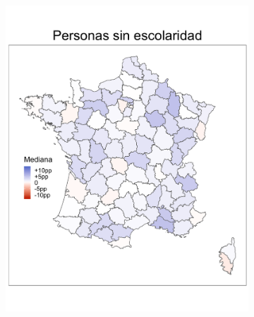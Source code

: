 \begin{figure}
\begin{subfigure}{0.275\textwidth}
	\includegraphics[width = \textwidth]{Figs/Efectos/Mapa_Efectos_Dip1_Modelo_H}
	\end{subfigure}
	~
	\begin{subfigure}{0.275\textwidth}

\end{subfigure}
\end{figure}
